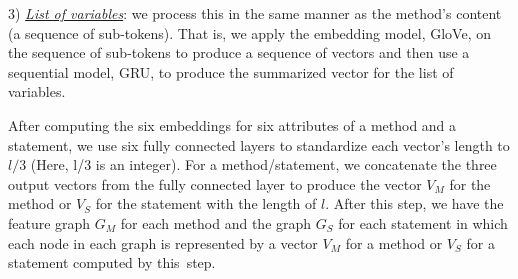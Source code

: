 3) {\em \underline{List of variables}}: we process this in the same
manner as the method's content (a sequence of sub-tokens). That is, we
apply the embedding model, GloVe, on the sequence of sub-tokens to
produce a sequence of vectors and then use a sequential model, GRU, to
produce the summarized vector for the list of variables.


After computing the six embeddings for six attributes of a method and
a statement, we use six fully connected layers to standardize each
vector's length to $l/3$ (Here, l/3 is an integer). For a
method/statement, we concatenate the three output vectors from the
fully connected layer to produce the vector $V_{M}$ for the method or
$V_{S}$ for the statement with the length of $l$. After this 
step, we have the feature graph $G_{M}$ for each method and the graph
$G_{S}$ for each statement in which each node in each graph is
represented by a vector $V_{M}$ for a method or $V_{S}$ for a
statement computed by this~step.

